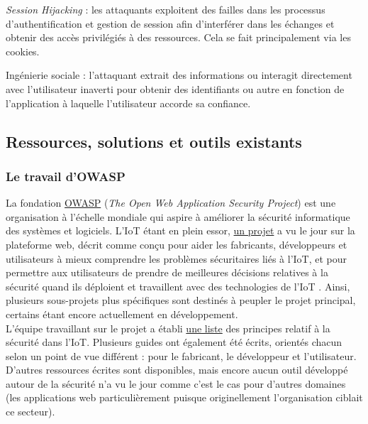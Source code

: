\documentclass[]{article}
\begin{document}
\par \textit{Session Hijacking} : les attaquants exploitent des failles dans les processus d'authentification et gestion de session afin d'interférer dans les échanges et obtenir des accès privilégiés à des ressources. Cela se fait principalement via les cookies.\\

\par Ingénierie sociale : l'attaquant extrait des informations ou interagit directement avec l'utilisateur inaverti pour obtenir des identifiants ou autre en fonction de l'application à laquelle l'utilisateur accorde sa confiance.

\newpage


\subsection{Ressources, solutions et outils existants}
\label{scanners}

\subsubsection{Le travail d'OWASP}

La fondation \href{https://www.owasp.org/index.php/Main_Page}{OWASP} (\textit{The Open Web Application Security Project}) est une organisation à l'échelle mondiale qui aspire à améliorer la sécurité informatique des systèmes et logiciels. L'IoT étant en plein essor, \href{https://www.owasp.org/index.php/OWASP_Internet_of_Things_Project}{un projet} a vu le jour sur la plateforme web, décrit comme \og conçu pour aider les fabricants, développeurs et utilisateurs à mieux comprendre les problèmes sécuritaires liés à l'IoT, et pour permettre aux utilisateurs de prendre de meilleures décisions relatives à la sécurité quand ils déploient et travaillent avec des technologies de l'IoT \fg .
Ainsi, plusieurs sous-projets plus spécifiques sont destinés à peupler le projet principal, certains étant encore actuellement en développement.\\

L'équipe travaillant sur le projet a établi \href{https://www.owasp.org/index.php/Principles_of_IoT_Security}{une liste} des principes relatif à la sécurité dans l'IoT. Plusieurs guides ont également été écrits, orientés chacun selon un point de vue différent : pour le fabricant, le développeur et l'utilisateur. D'autres ressources écrites sont disponibles, mais encore aucun outil développé autour de la sécurité n'a vu le jour comme c'est le cas pour d'autres domaines (les applications web particulièrement puisque originellement l'organisation ciblait ce secteur).	 
\end{document}
